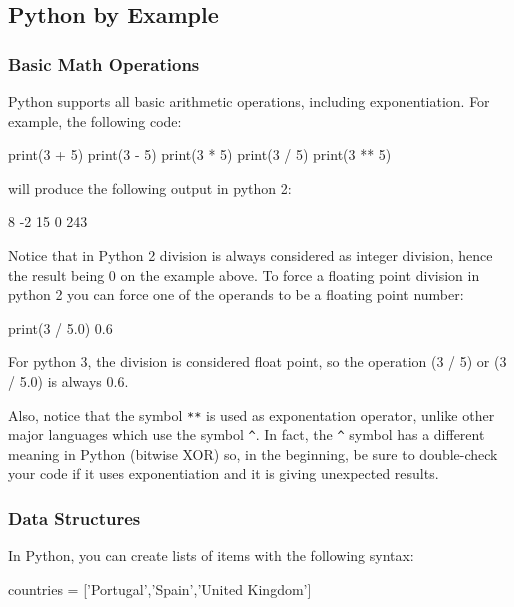 
\subsection{Python by Example}

\subsubsection{Basic Math Operations}

Python supports all basic arithmetic operations, including exponentiation. For
example, the following code: \begin{python}
print(3 + 5)
print(3 - 5)
print(3 * 5)
print(3 / 5)
print(3 ** 5)
\end{python}

\noindent will produce the following output in python 2:
\begin{python}
8
-2
15
0
243
\end{python}

Notice that in Python 2 division is always considered as integer division, hence the result
being 0 on the example above. To force a floating point division in python 2 you can force
one of the operands to be a floating point number: \begin{python}
print(3 / 5.0)
0.6
\end{python}

For python 3, the division is considered float point, so the operation (3 / 5) or (3 / 5.0) is always 0.6. 

Also, notice that the symbol \texttt{**} is used as exponentation operator, unlike other major languages which use the symbol \texttt{\^}. In fact, the \texttt{\^} symbol has a different meaning in Python (bitwise XOR) so, in the beginning, be sure to double-check your code if it uses exponentiation and it is giving unexpected results.

\subsubsection{Data Structures}

In Python, you can create lists of items with the following syntax:

\begin{python}
countries = ['Portugal','Spain','United Kingdom']
\end{python}

